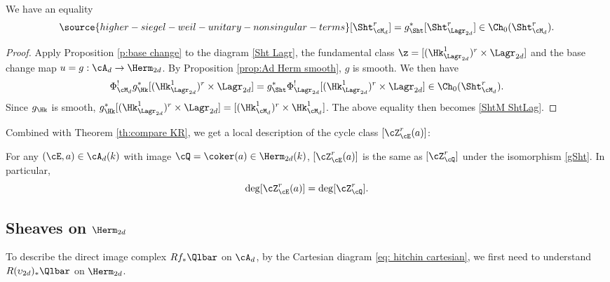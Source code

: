 \begin{prop}
\notready We have an equality
\label{prop:sht-pullback-class}
\begin{equation}\label{ShtM ShtLag}
\source{higher-siegel-weil-unitary-nonsingular-terms}
[\Sht^{r}_{\cM_{d}}]=g_{\Sht}^{*}[\Sht^{r}_{\Lagr_{2d}}]\in \Ch_{0}(\Sht^{r}_{\cM_{d}}).
\end{equation}
\end{prop}
\begin{proof}
Apply Proposition \ref{p:base change} to the diagram \eqref{Sht Lagr}, the fundamental class $\z=[(\Hk^{1}_{\Lagr_{2d}})^{r} \times \Lagr_{2d}]$ and the base change map $u=g: \cA_{d}\to \Herm_{2d}$. By Proposition \ref{prop:Ad Herm smooth}, $g$ is smooth. We then have
\begin{equation}
\Phi_{\cM_{d}}^{!}g_{\Hk}^{*}[(\Hk^{1}_{\Lagr_{2d}})^{r} \times \Lagr_{2d}]=g^{*}_{\Sht}\Phi_{\Lagr_{2d}}^{!}[(\Hk^{1}_{\Lagr_{2d}})^{r} \times \Lagr_{2d}]\in \Ch_{0}(\Sht^{r}_{\cM_{d}}).
\end{equation}
Since $g_{\Hk}$ is smooth,  $g_{\Hk}^{*}[(\Hk^{1}_{\Lagr_{2d}})^{r} \times \Lagr_{2d}]=[(\Hk^{1}_{\cM_{d}})^{r} \times \Hk^{1}_{\cM_{d}}]$. The above equality then becomes \eqref{ShtM ShtLag}.
\end{proof}


Combined with Theorem \ref{th:compare KR}, we get a local description of the cycle class $[\cZ^{r}_{\cE}(a)]$:
\begin{cor}
\notready\label{c:Zloc}For any $(\cE,a)\in \cA_{d}(k)$ with image $\cQ=\coker(a)\in \Herm_{2d}(k)$, $[\cZ^{r}_{\cE}(a)]$ is the same as $[\cZ^{r}_{\cQ}]$ under the isomorphism \eqref{gSht}. In particular,
\begin{equation}
\deg[\cZ^{r}_{\cE}(a)]=\deg[\cZ^{r}_{\cQ}].
\end{equation}
\end{cor}



\subsection{Sheaves on $\Herm_{2d}$}
To describe the direct image complex $Rf_{*}\Qlbar$ on $\cA_{d}$, by the Cartesian diagram \eqref{eq: hitchin cartesian}, we first need to understand $R(\upsilon_{2d})_*\Qlbar$ on $\Herm_{2d}$.

